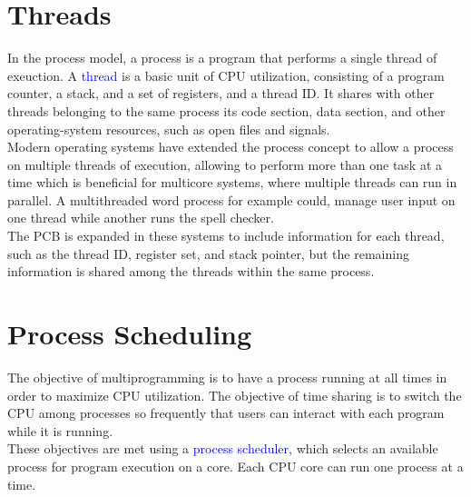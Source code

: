 \documentclass{book/custombook}
\begin{document}
        \section{Threads}
            In the process model, a process is a program that performs a single thread of exeuction. 
            A \textcolor{blue}{thread} is a basic unit of CPU utilization, consisting of a program counter,
            a stack, and a set of registers, and a thread ID. It shares with other threads belonging to the same
            process its code section, data section, and other operating-system resources, such as open files and signals.\\
            Modern operating systems have extended the process concept to allow a process on multiple threads of execution, allowing to perform more than one task at a time which is beneficial for multicore systems, where multiple threads can run in parallel. A multithreaded word process for example could, manage user input on one thread while another runs the spell checker.\\
            The PCB is expanded in these systems to include information for each thread, such as the thread ID, register set, and stack pointer, but the remaining information is shared among the threads within the same process.
        \section{Process Scheduling}
            The objective of multiprogramming is to have a process running at all times in order to maximize CPU utilization. The objective of time sharing is to switch the CPU among processes so frequently that users can interact with each program while it is running.\\
            These objectives are met using a \textcolor{blue}{process scheduler}, which selects an available process for program execution on a core. Each CPU core can run one process at a time.
\end{document}
